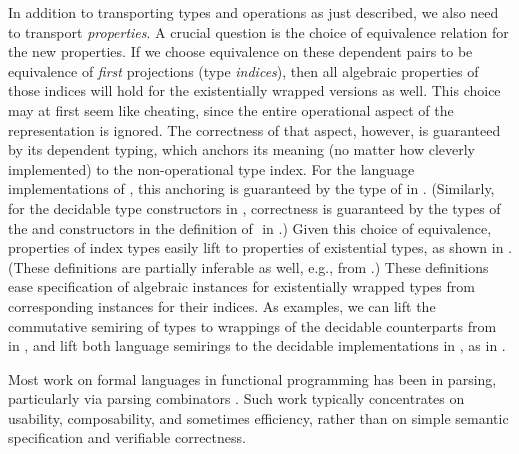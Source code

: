\documentclass[acmsmall,screen,anonymous,timestamp]{acmart}
\begin{document}
In addition to transporting types and operations as just described, we also need to transport \emph{properties}.
A crucial question is the choice of equivalence relation for the new properties.
If we choose equivalence on these dependent pairs to be equivalence of \emph{first} projections (type \emph{indices}), then all algebraic properties of those indices will hold for the existentially wrapped versions as well.
This choice may at first seem like cheating, since the entire operational aspect of the representation is ignored.
The correctness of that aspect, however, is guaranteed by its dependent typing, which anchors its meaning (no matter how cleverly implemented) to the non-operational type index.
For the language implementations of , this anchoring is guaranteed by the type of  in .
(Similarly, for the decidable type constructors in , correctness is guaranteed by the types of the  and  constructors in the definition of ‌ in .)
Given this choice of equivalence, properties of index types easily lift to properties of existential types, as shown in .
(These definitions are partially inferable as well, e.g., from .)
These definitions ease specification of algebraic instances for existentially wrapped types from corresponding instances for their indices.
\rnc{}
As examples, we can lift the commutative semiring of types to wrappings of the decidable counterparts from  in , and lift both language semirings to the decidable implementations in , as in .



Most work on formal languages in functional programming has been in parsing, particularly via parsing combinators \citep{Hutton1996monadic, Leijen2001parsec, Swierstra2008combinator}.
Such work typically concentrates on usability, composability, and sometimes efficiency, rather than on simple semantic specification and verifiable correctness.
\end{document}
